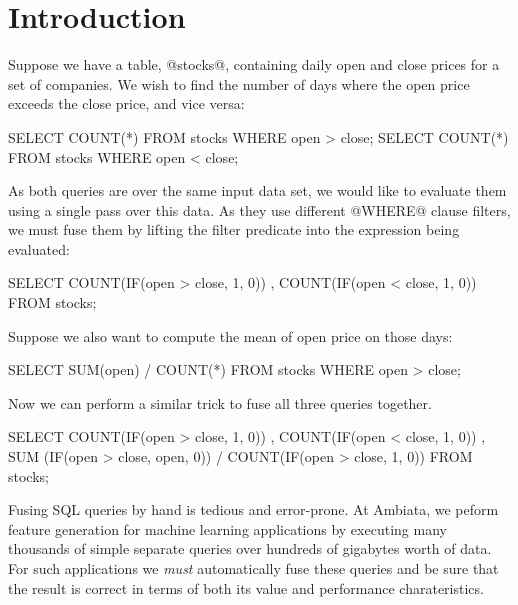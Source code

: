 \section{Introduction}
\label{s:Introduction}



Suppose we have a table, @stocks@, containing daily open and close prices for a set of companies. We wish to find the number of days where the open price exceeds the close price, and vice versa:
\begin{code}
  SELECT COUNT(*) FROM stocks WHERE open > close;
  SELECT COUNT(*) FROM stocks WHERE open < close;
\end{code}
As both queries are over the same input data set, we would like to evaluate them using a single pass over this data. As they use different @WHERE@ clause filters, we must fuse them by lifting the filter predicate into the expression being evaluated:


\begin{code}
  SELECT COUNT(IF(open > close, 1, 0))
       , COUNT(IF(open < close, 1, 0))
  FROM stocks;
\end{code}
Suppose we also want to compute the mean of open price on those days:
\begin{code}
  SELECT SUM(open) / COUNT(*)
  FROM   stocks
  WHERE  open > close;
\end{code}
Now we can perform a similar trick to fuse all three queries together.
%
\begin{code}
  SELECT COUNT(IF(open > close, 1, 0))
       , COUNT(IF(open < close, 1, 0))
       , SUM  (IF(open > close, open, 0))
       / COUNT(IF(open > close, 1, 0))
FROM stocks;
\end{code}

Fusing SQL queries by hand is tedious and error-prone. At Ambiata, we peform feature generation for machine learning applications by executing many thousands of simple separate queries over hundreds of gigabytes worth of data. For such applications we \emph{must} automatically fuse these queries and be sure that the result is correct in terms of both its value and performance charateristics. 

